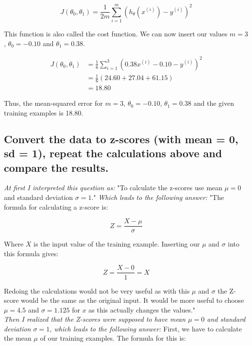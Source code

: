 \documentclass[12pt, a4paper]{article}
\begin{document}
		\begin{equation*}
		J(\theta_0, \theta_1) = \frac{1}{2m} \sum\limits_{i=1}^m (h _{\theta} (x ^{(i)}) - y ^{(i)})^2
		\end{equation*}
		
		This function is also called the cost function. We can now insert our values $m=3$, $\theta_0=-0.10$ and $\theta_1=0.38$.
		
		\begin{align*}
		J(\theta_0, \theta_1) &= \frac{1}{6} \sum\limits_{i=1}^3 (0.38x ^{(i)} - 0.10 - y ^{(i)})^2\\
		 &= \frac{1}{6} (24.60+27.04+61.15)\\
		&=18.80
		\end{align*}
		
		Thus, the mean-squared error for $m=3$, $\theta_0=-0.10$, $\theta_1=0.38$ and the given training examples is 18.80.
	
	\subsection{Convert the data to z-scores (with mean = 0, sd = 1), repeat the calculations above and compare the results.}
	\textit{At first I interpreted this question as:} "To calculate the z-scores use mean $\mu=0$ and standard deviation $\sigma=1$."
	\textit{Which leads to the following answer:} "The formula for calculating a z-score is:
	
	\begin{equation*}
	Z = \frac{X-\mu}{\sigma}
	\end{equation*}
	
	Where $X$ is the input value of the training example. Inserting our $\mu$ and $\sigma$ into this formula gives:
	
	\begin{equation*}
	Z = \frac{X-0}{1} = X
	\end{equation*}
	
	Redoing the calculations would not be very useful as with this $\mu$ and $\sigma$ the Z-score would be the same as the original input. It would be more useful to choose $\mu=4.5$ 
	and $\sigma=1.125$ for $x$ as this actually changes the values."\\

	\textit{Then I realized that the Z-scores were supposed to have mean $\mu=0$ and standard deviation $\sigma=1$, which leads to the following answer:}
	First, we have to calculate the mean $\mu$ of our training examples. The formula for this is:
\end{document}
